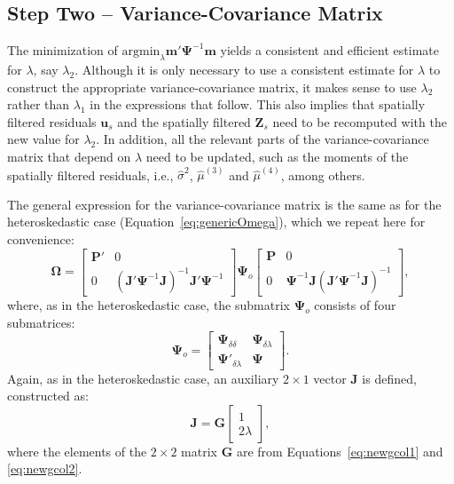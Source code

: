 \documentclass{article}
\begin{document}
\subsection{Step Two -- Variance-Covariance Matrix}
The minimization of $\mbox{argmin}_\lambda \mathbf{m'}\mathbf{\mathbf{\Psi}}^{-1} \mathbf{m}$
yields a consistent and efficient estimate for $\lambda$, say $\lambda_2$. Although it is only
necessary to use a consistent estimate for $\lambda$ to construct the appropriate
variance-covariance matrix, it makes sense to use $\lambda_2$ rather than $\lambda_1$ in
the expressions that follow. This also implies that spatially filtered residuals $\mathbf{u}_s$
and the spatially filtered $\mathbf{Z}_s$ need to be recomputed with the new value
for $\lambda_2$. In addition, all the relevant parts of the variance-covariance
matrix that depend on $\lambda$ need to be updated, such as the moments of the spatially filtered residuals, i.e., $\hat{\sigma}^2$,
$\hat{\mu}^{(3)}$ and $\hat{\mu}^{(4)}$, among others.

The general expression for the variance-covariance matrix is the same as for the
heteroskedastic case (Equation~\ref{eq:genericOmega}), which we repeat here for
convenience: 
\begin{equation*}
\mathbf{\Omega} =
\left[
\begin{matrix}
\mathbf{P'} & 0\\
0 & (\mathbf{J'} \mathbf{\Psi}^{-1} \mathbf{J} )^{-1} \mathbf{J'} \mathbf{\Psi}^{-1} 
\end{matrix}
\right]
\mathbf{\Psi}_o
\left[
\begin{matrix}
\mathbf{P} & 0\\
0 &  \mathbf{\Psi}^{-1} \mathbf{J}  (\mathbf{J'} \mathbf{\Psi}^{-1} \mathbf{J} )^{-1}  
\end{matrix}
\right],
\end{equation*}
where, as in the heteroskedastic case, the submatrix 
 $\mathbf{\mathbf{\Psi}}_o$ consists of four
submatrices:
\begin{equation*}
\mathbf{\mathbf{\Psi}}_o =
\left[
\begin{matrix}
\mathbf{\Psi}_{\delta \delta} & \mathbf{\Psi}_{\delta \lambda}\\
\mathbf{\Psi}'_{\delta \lambda} & \mathbf{\Psi}
\end{matrix}
\right].
\end{equation*}
Again, as in the heteroskedastic case, an auxiliary $2 \times 1$ vector $\mathbf{J}$
is defined, constructed as:
\begin{equation}\label{eq:J}
\mathbf{J} = \mathbf{G}
\left[
\begin{matrix}
1 \\
2 \lambda
\end{matrix}
\right],
\end{equation}
where the elements of the $2 \times 2$ matrix $\mathbf{G}$ are from Equations~\ref{eq:newgcol1}
and \ref{eq:newgcol2}.
\end{document}
